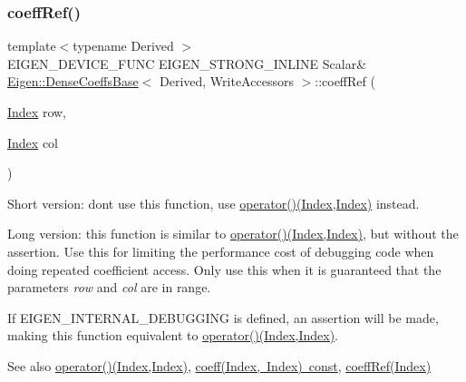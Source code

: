 \subsubsection{\texorpdfstring{coeffRef()}{coeffRef()}\hspace{0.1cm}{\footnotesize\ttfamily [1/2]}}
{\footnotesize\ttfamily template$<$typename Derived $>$ \\
E\+I\+G\+E\+N\+\_\+\+D\+E\+V\+I\+C\+E\+\_\+\+F\+U\+NC E\+I\+G\+E\+N\+\_\+\+S\+T\+R\+O\+N\+G\+\_\+\+I\+N\+L\+I\+NE Scalar\& \mbox{\hyperlink{class_eigen_1_1_dense_coeffs_base}{Eigen\+::\+Dense\+Coeffs\+Base}}$<$ Derived, Write\+Accessors $>$\+::coeff\+Ref (\begin{DoxyParamCaption}\item[{\mbox{\hyperlink{struct_eigen_1_1_eigen_base_a554f30542cc2316add4b1ea0a492ff02}{Index}}}]{row,  }\item[{\mbox{\hyperlink{struct_eigen_1_1_eigen_base_a554f30542cc2316add4b1ea0a492ff02}{Index}}}]{col }\end{DoxyParamCaption})\hspace{0.3cm}{\ttfamily [inline]}}

Short version\+: don\textquotesingle{}t use this function, use \mbox{\hyperlink{class_eigen_1_1_dense_coeffs_base_3_01_derived_00_01_write_accessors_01_4_ab0c40ee1944059a3e32a125cf794d547}{operator()(\+Index,\+Index)}} instead.

Long version\+: this function is similar to \mbox{\hyperlink{class_eigen_1_1_dense_coeffs_base_3_01_derived_00_01_write_accessors_01_4_ab0c40ee1944059a3e32a125cf794d547}{operator()(\+Index,\+Index)}}, but without the assertion. Use this for limiting the performance cost of debugging code when doing repeated coefficient access. Only use this when it is guaranteed that the parameters {\itshape row} and {\itshape col} are in range.

If E\+I\+G\+E\+N\+\_\+\+I\+N\+T\+E\+R\+N\+A\+L\+\_\+\+D\+E\+B\+U\+G\+G\+I\+NG is defined, an assertion will be made, making this function equivalent to \mbox{\hyperlink{class_eigen_1_1_dense_coeffs_base_3_01_derived_00_01_write_accessors_01_4_ab0c40ee1944059a3e32a125cf794d547}{operator()(\+Index,\+Index)}}.

\begin{DoxySeeAlso}{See also}
\mbox{\hyperlink{class_eigen_1_1_dense_coeffs_base_3_01_derived_00_01_write_accessors_01_4_ab0c40ee1944059a3e32a125cf794d547}{operator()(\+Index,\+Index)}}, \mbox{\hyperlink{class_eigen_1_1_dense_coeffs_base_3_01_derived_00_01_read_only_accessors_01_4_ad41647ef695f9a5a58a9a0f50e2ae064}{coeff(\+Index, Index) const}}, \mbox{\hyperlink{class_eigen_1_1_dense_coeffs_base_3_01_derived_00_01_write_accessors_01_4_a3187593ec72fc6f4fa64a86e0383375b}{coeff\+Ref(\+Index)}} 
\end{DoxySeeAlso}
\mbox{\label{class_eigen_1_1_dense_coeffs_base_3_01_derived_00_01_write_accessors_01_4_a3187593ec72fc6f4fa64a86e0383375b}} 
